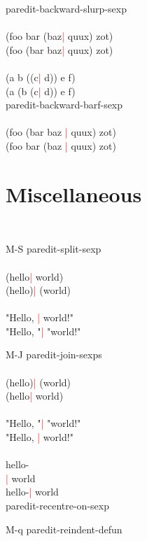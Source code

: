 \documentclass[8pt,a4paper,landscape]{extarticle}
\newcommand{\csr}{\textcolor{red}{| }}
\begin{document}
\begin{multicols}{4}
\begin{eqlist}
\longitem[C-(] paredit-backward-slurp-sexp\\
  \\
  (foo bar (baz\csr  quux) zot)\\
  (foo (bar baz\csr  quux) zot)\\
  \\
  (a b ((c\csr  d)) e f)\\
  (a (b (c\csr  d)) e f)\\


\longitem[C-\{] paredit-backward-barf-sexp\\
  \\
  (foo (bar baz \csr quux) zot)\\
  (foo bar (baz \csr quux) zot)\\
\end{eqlist}

\section{Miscellaneous}
\begin{eqlist}
  \tt
\item[M-S] paredit-split-sexp\\
  \\
  (hello\csr  world)\\
  (hello)\csr  (world)\\
  \\
  "Hello, \csr world!"\\
  "Hello, "\csr  "world!"\\


\item[M-J] paredit-join-sexps\\
  \\
  (hello)\csr  (world)\\
  (hello\csr  world)\\
  \\
  "Hello, "\csr  "world!"\\
  "Hello, \csr world!"\\
  \\
  hello-\\
  \csr   world\\
  hello-\csr world\\

\longitem[C-c C-M-l] paredit-recentre-on-sexp

\item[M-q] paredit-reindent-defun

\end{eqlist}

\end{multicols}
\end{document}
